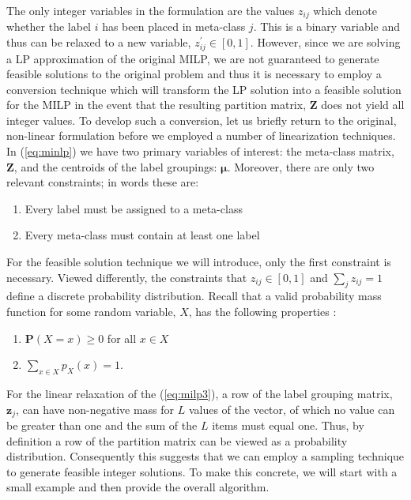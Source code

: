 \documentclass[../thesis.tex]{subfiles}
\begin{document}
The only integer variables in the formulation are the values $z_{ij}$ which denote whether the label $i$ has been placed in meta-class $j$. This is a binary variable and thus can be relaxed to a new variable, $z_{ij}^\prime \in [0, 1]$. However, since we are solving a LP approximation of the original MILP, we are not guaranteed to generate feasible solutions to the original problem and thus it is necessary to employ a conversion technique which will transform the LP solution into a feasible solution for the MILP in the event that the resulting partition matrix, $\mathbf{Z}$ does not yield all integer values. To develop such a conversion, let us briefly return to the original, non-linear formulation before we employed a number of linearization techniques. In (\ref{eq:minlp}) we have two primary variables of interest: the meta-class matrix, $\mathbf{Z}$, and the centroids of the label groupings: $\boldsymbol{\mu}$. Moreover, there are only two relevant constraints; in words these are:
\begin{enumerate}
    \item Every label must be assigned to a meta-class
    \item Every meta-class must contain at least one label
\end{enumerate}
For the feasible solution technique we will introduce, only the first constraint is necessary. Viewed differently, the constraints that $z_{ij} \in [0, 1]$ and $\sum_j z_{ij} = 1$ define a discrete probability distribution. Recall that a valid probability mass function for some random variable, $X$, has the following properties \cite{blitzstein2014introduction}:
\begin{enumerate}
    \item $\mathbf{P}(X = x) \geq 0$ for all $x \in X$
    \item $\sum_{x \in X} p_X(x) = 1$.
\end{enumerate}
For the linear relaxation of the (\ref{eq:milp3}), a row of the label grouping matrix, $\mathbf{z}_j$, can have non-negative mass for $L$ values of the vector, of which no value can be greater than one and the sum of the $L$ items must equal one. Thus, by definition a row of the partition matrix can be viewed as a probability distribution. Consequently this suggests that we can employ a sampling technique to generate feasible integer solutions. To make this concrete, we will start with a small example and then provide the overall algorithm.
\end{document}
